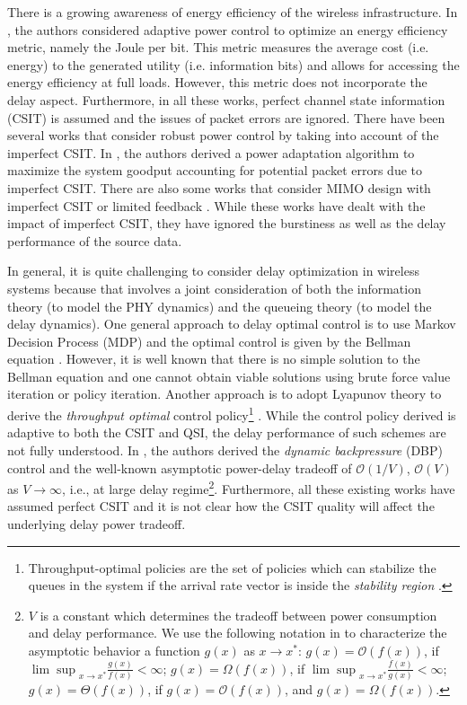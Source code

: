 \documentclass[11pt,journal, onecolumn]{./IEEEtran}
\newcommand{\blue}{\color{black}}
\newcommand{\red}{\color{black}}
\begin{document}
There is a growing awareness of energy efficiency of the wireless infrastructure. In \cite{meshkati_energy-efficient_2007, mingbo_xiao_utility-based_2003}, the authors considered adaptive power control to optimize an energy efficiency metric, namely the Joule per bit. This metric measures the average cost (i.e. energy) to the generated utility (i.e. information bits) and allows for accessing the energy efficiency at full loads. However, this metric does not incorporate the delay aspect. Furthermore, in all these works, perfect channel state information (CSIT) is assumed and the issues of packet errors are ignored.
There have been several works that consider robust power control by taking into account of the imperfect CSIT. In \cite{rey_robust_2005, yingwei_yao_rate-maximizing_2005}, the authors derived a power adaptation algorithm to maximize the system goodput accounting for potential packet errors due to imperfect CSIT.
There are also some works that consider MIMO design with imperfect CSIT \cite{rey_robust_2005, yoo_capacity_2006} or limited feedback \cite{love_overview_2008}. While these works have dealt with the impact of imperfect CSIT, they have ignored the burstiness as well as the delay performance of the source data.


In general, it is quite challenging to consider delay optimization in wireless systems because that involves a joint consideration of both the information theory (to model the PHY dynamics) and the queueing theory (to model the delay dynamics).
One general approach to delay optimal control is to use Markov Decision Process (MDP) and the optimal control is given by the Bellman equation \cite{bertsekas_dynamic_1987}. However, it is well known that there is no simple solution to the Bellman equation and one cannot obtain viable solutions using brute force value iteration or policy iteration.
Another approach is to adopt Lyapunov theory to derive the {\em throughput optimal} control policy\footnote{Throughput-optimal policies  are  the  set of policies which  can  stabilize the queues in the system if the arrival rate vector is inside the \emph{stability region} \cite{tassiulas_stability_1992}.} \cite{georgiadis_resource_2006}.
While the control policy derived is adaptive to both the CSIT and QSI, the delay performance of such schemes are not fully understood. In {\blue\cite{neely_energy_2006},} the authors derived the {\em dynamic backpressure} (DBP) control
and the well-known asymptotic power-delay tradeoff of $\mathcal{O}(1/V)$, $\mathcal{O}(V)$ {\red as $V\to\infty$, i.e., at large delay regime\footnote{\red $V$ is a
constant which determines the tradeoff between power consumption and delay performance. We use the following notation in \cite{berry_optimal_2006} to characterize the asymptotic behavior a function $g(x)$ as $x\to x^*$: $g(x)=\mathcal{O}(f(x))$, if ${\lim\sup}_{x\to x^*}\frac{g(x)}{f(x)}<\infty$; $g(x)=\Omega(f(x))$, if ${\lim\sup}_{x\to x^*}\frac{f(x)}{g(x)}<\infty$; $g(x)=\Theta(f(x))$, if $g(x)=\mathcal{O}(f(x))$, and $g(x)=\Omega(f(x))$.}.} Furthermore, all these existing works have assumed perfect CSIT and it is not clear how the CSIT quality will affect the underlying delay power tradeoff.
\end{document}
